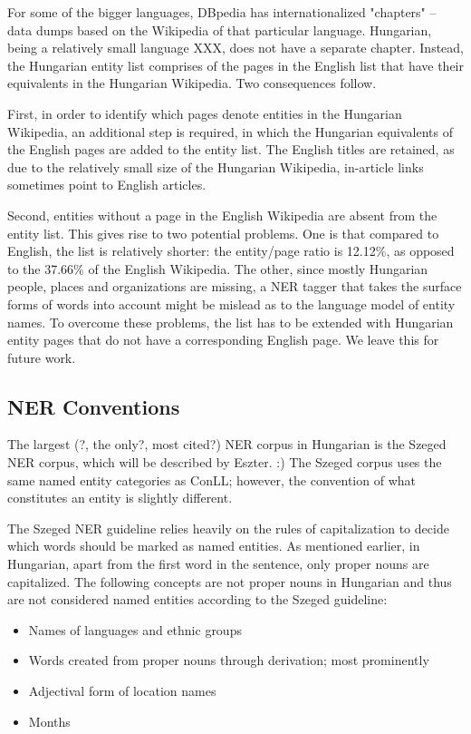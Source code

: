 \documentclass[11pt]{article}
\begin{document}
For some of the bigger languages, DBpedia has internationalized "chapters" -- data dumps based on the Wikipedia of that particular language. Hungarian, being a relatively small language XXX, does not have a separate chapter. Instead, the Hungarian entity list comprises of the pages in the English list that have their equivalents in the Hungarian Wikipedia. Two consequences follow.

First, in order to identify which pages denote entities in the Hungarian Wikipedia, an additional step is required, in which the Hungarian equivalents of the English pages are added to the entity list. The English titles are retained, as due to the relatively small size of the Hungarian Wikipedia, in-article links sometimes point to English articles.

Second, entities without a page in the English Wikipedia are absent from the entity list. This gives rise to two potential problems. One is that compared to English, the list is relatively shorter: the entity/page ratio is 12.12\%, as opposed to the 37.66\% of the English Wikipedia. The other, since mostly Hungarian people, places and organizations are missing, a NER tagger that takes the surface forms of words into account might be mislead as to the language model of entity names. To overcome these problems, the list has to be extended with Hungarian entity pages that do not have a corresponding English page. We leave this for future work.

\subsection{NER Conventions}

The largest (?, the only?, most cited?) NER corpus in Hungarian is the Szeged NER corpus, which will be described by Eszter. :) The Szeged corpus uses the same named entity categories as ConLL; however, the convention of what constitutes an entity is slightly different.

The Szeged NER guideline relies heavily on the rules of capitalization to decide which words should be marked as named entities. As mentioned earlier, in Hungarian, apart from the first word in the sentence, only proper nouns are capitalized. The following concepts are not proper nouns in Hungarian and thus are not considered named entities according to the Szeged guideline:
\begin{itemize}
\item Names of languages and ethnic groups
\item Words created from proper nouns through derivation; most prominently
\item Adjectival form of location names
\item Months
\end{itemize}
\end{document}
